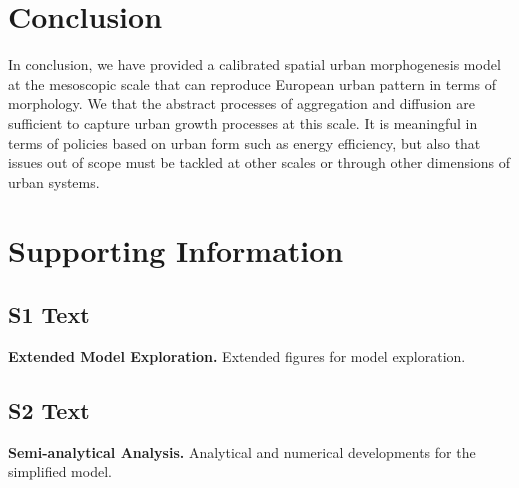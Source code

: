 \documentclass[10pt,letterpaper]{article}
\begin{document}
\section*{Conclusion}


In conclusion, we have provided a calibrated spatial urban morphogenesis model at the mesoscopic scale that can reproduce  European urban pattern in terms of  morphology. We  that the abstract processes of aggregation and diffusion are sufficient to capture urban growth processes at this scale. It is meaningful in terms of policies based on urban form such as energy efficiency, but also  that issues out of  scope must be tackled at other scales or through other dimensions of urban systems.




\section*{Supporting Information}



\subsection*{S1 Text}
\label{S1_Text}
{\bf Extended Model Exploration.} Extended figures for model exploration.

\subsection*{S2 Text}
\label{S2_Text}
{\bf Semi-analytical Analysis.} Analytical and numerical developments for the simplified model.

\subsection*{}
\label{S3_Text}
{\bf {}} 

\end{document}
